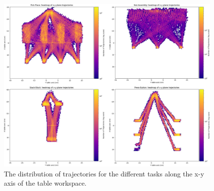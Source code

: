 \begin{figure}[t]
    \centering
    \includegraphics[width=1.0\textwidth]{figures/images/ch3/dataset_distribution.jpg}
    \caption{The distribution of trajectories for the different tasks along the x-y axis of the table workspace.}
    \label{fig:dataset_distribution}
\end{figure}

